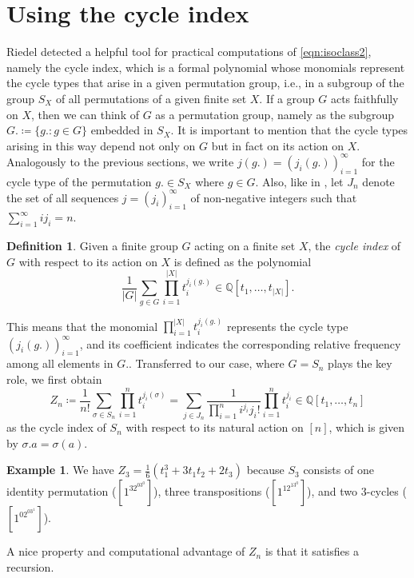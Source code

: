 \documentclass[12pt]{article}
\let\Cref\crtCref
\theoremstyle{definition}
\newtheorem{definition}[theorem]{Definition}
\newtheorem{example}[theorem]{Example}
\theoremstyle{remark}
\begin{document}
	\section{Using the cycle index}
	Riedel \cite{R} detected a helpful tool for practical computations of \eqref{eqn:isoclass2}, namely the cycle index, which is a formal polynomial whose monomials represent the cycle types that arise in a given permutation group, i.e., in a subgroup of the group $S_X$ of all permutations of a given finite set $X$. If a group $G$ acts faithfully on $X$, then we can think of $G$ as a permutation group, namely as the subgroup $G. \coloneqq \{g. : g \in G\}$ embedded in $S_X$. It is important to mention that the cycle types arising in this way depend not only on $G$ but in fact on its action on $X$. Analogously to the previous sections, we write $j(g.) = (j_i(g.))_{i=1}^{\infty}$ for the cycle type of the permutation $g.\in S_X$ where $g \in G$. Also, like in \Cref{thm:main,thm:main_k}, let $J_n$ denote the set of all sequences $j=(j_i)_{i=1}^{\infty}$ of non-negative integers such that $\sum_{i=1}^{\infty} ij_i = n$.
	\begin{definition}
		Given a finite group $G$ acting on a finite set $X$, the \emph{cycle index} of $G$ with respect to its action on $X$ is defined as the polynomial
		\[
		\frac1{\lvert G\rvert}\sum_{g\in G}\prod_{i=1}^{\lvert X\rvert} t_i^{j_i(g.)} \in \mathbb Q[t_1,\dots,t_{\lvert X\rvert}].
		\]
	\end{definition}
	This means that the monomial $\prod_{i=1}^{\lvert X\rvert} t_i^{j_i(g.)}$ represents the cycle type $(j_i(g.))_{i=1}^{\infty}$, and its coefficient indicates the corresponding relative frequency among all elements in $G.$. Transferred to our case, where $G=S_n$ plays the key role, we first obtain
	\begin{equation}\label{eqn:cycle_index}
	Z_n \coloneqq \frac{1}{n!}\sum_{\sigma\in S_n}  \prod_{i=1}^n t_i^{j_i(\sigma)} = \sum_{j\in J_n} \frac{1}{\prod_{i=1}^n i^{j_i} j_i!} \prod_{i=1}^n t_i^{j_i} \in \mathbb Q[t_1,\dots,t_n]
	\end{equation}
	as the cycle index of $S_n$ with respect to its natural action on $[n]$, which is given by $\sigma.a = \sigma(a)$.
	\begin{example}
		We have $Z_3 = \frac16(t_1^3+3t_1t_2+2t_3)$ because $S_3$ consists of one identity permutation ($[1^32^03^0]$), three transpositions ($[1^12^13^0]$), and two $3$-cycles ($[1^02^03^1]$).
	\end{example}
	A nice property and computational advantage of $Z_n$ is that it satisfies a recursion.
\end{document}
